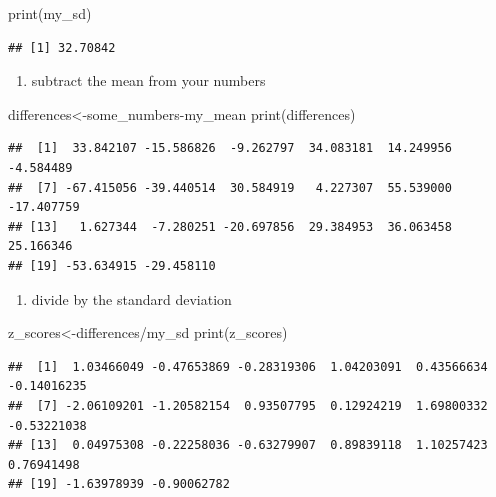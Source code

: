 \documentclass[
]{book}
\newenvironment{Shaded}{\begin{snugshade}}{\end{snugshade}}
\newcommand{\FunctionTok}[1]{\textcolor[rgb]{0.00,0.00,0.00}{#1}}
\newcommand{\NormalTok}[1]{#1}
\newcommand{\OtherTok}[1]{\textcolor[rgb]{0.56,0.35,0.01}{#1}}
\newcommand{\SpecialCharTok}[1]{\textcolor[rgb]{0.00,0.00,0.00}{#1}}
\providecommand{\tightlist}{%
  \setlength{\itemsep}{0pt}\setlength{\parskip}{0pt}}
\begin{document}
\begin{Shaded}
\begin{Highlighting}[]
\FunctionTok{print}\NormalTok{(my\_sd)}
\end{Highlighting}
\end{Shaded}

\begin{verbatim}
## [1] 32.70842
\end{verbatim}

\begin{enumerate}
\def\labelenumi{\arabic{enumi}.}
\setcounter{enumi}{2}
\tightlist
\item
  subtract the mean from your numbers
\end{enumerate}

\begin{Shaded}
\begin{Highlighting}[]
\NormalTok{differences}\OtherTok{\textless{}{-}}\NormalTok{some\_numbers}\SpecialCharTok{{-}}\NormalTok{my\_mean}
\FunctionTok{print}\NormalTok{(differences)}
\end{Highlighting}
\end{Shaded}

\begin{verbatim}
##  [1]  33.842107 -15.586826  -9.262797  34.083181  14.249956  -4.584489
##  [7] -67.415056 -39.440514  30.584919   4.227307  55.539000 -17.407759
## [13]   1.627344  -7.280251 -20.697856  29.384953  36.063458  25.166346
## [19] -53.634915 -29.458110
\end{verbatim}

\begin{enumerate}
\def\labelenumi{\arabic{enumi}.}
\setcounter{enumi}{3}
\tightlist
\item
  divide by the standard deviation
\end{enumerate}

\begin{Shaded}
\begin{Highlighting}[]
\NormalTok{z\_scores}\OtherTok{\textless{}{-}}\NormalTok{differences}\SpecialCharTok{/}\NormalTok{my\_sd}
\FunctionTok{print}\NormalTok{(z\_scores)}
\end{Highlighting}
\end{Shaded}

\begin{verbatim}
##  [1]  1.03466049 -0.47653869 -0.28319306  1.04203091  0.43566634 -0.14016235
##  [7] -2.06109201 -1.20582154  0.93507795  0.12924219  1.69800332 -0.53221038
## [13]  0.04975308 -0.22258036 -0.63279907  0.89839118  1.10257423  0.76941498
## [19] -1.63978939 -0.90062782
\end{verbatim}
\end{document}
